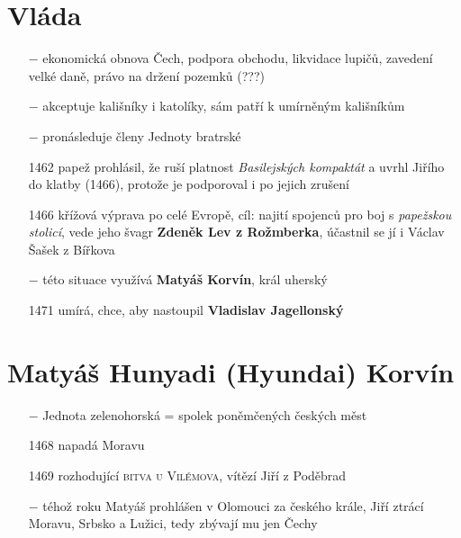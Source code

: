 \documentclass{article}
\begin{document}
\section*{Vláda}
\begin{itemize}
    \vspace{-0.5em}
    \setlength\itemsep{0.15em}
    \item[$-$] ekonomická obnova Čech, podpora obchodu, likvidace lupičů, zavedení velké daně, právo na držení pozemků (???)
    \item[$-$] akceptuje kališníky i katolíky, sám patří k umírněným kališníkům
    \item[$-$] pronásleduje členy Jednoty bratrské
    \item[1462] papež prohlásil, že ruší platnost \textit{Basilejských kompaktát} a uvrhl Jiřího do klatby (1466), protože je podporoval i po jejich zrušení
    \item[1466] křížová výprava po celé Evropě, cíl: najití spojenců pro boj s \textit{papežskou stolicí}, vede jeho švagr \textbf{Zdeněk Lev z Rožmberka}, účastnil se jí i Václav Šašek z Bířkova
    \item[$-$] této situace využívá \textbf{Matyáš Korvín}, král uherský
    \item[1471] umírá, chce, aby nastoupil \textbf{Vladislav Jagellonský} 
\end{itemize}


\section*{Matyáš Hunyadi (Hyundai) Korvín}
\begin{itemize}
    \vspace{-0.5em}
    \setlength\itemsep{0.15em}
    \item[$-$] Jednota zelenohorská = spolek poněmčených českých měst
    \item[1468] napadá Moravu
    \item[1469] rozhodující \textsc{bitva u Vilémova}, vítězí Jiří z Poděbrad
    \item[$-$] téhož roku Matyáš prohlášen v Olomouci za českého krále, Jiří ztrácí Moravu, Srbsko a Lužici, tedy zbývají mu jen Čechy

\end{itemize}
\end{document}

